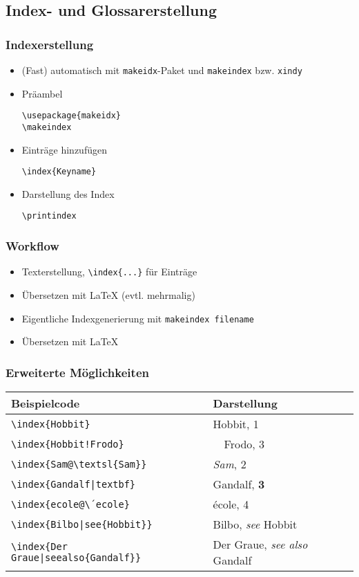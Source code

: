 \subsection{Index- und Glossarerstellung}
\begin{frame}[fragile]
  \frametitle{Indexerstellung}
  \begin{itemize}
  \item (Fast) automatisch mit \texttt{makeidx}-Paket und
    \texttt{makeindex} bzw. \texttt{xindy}
  \item Präambel
\begin{lstlisting}[language={[LaTeX]TeX}]
\usepackage{makeidx}
\makeindex
\end{lstlisting}
  \item Einträge hinzufügen
\begin{lstlisting}[language={[LaTeX]TeX}]
\index{Keyname}
\end{lstlisting}
  \item Darstellung des Index
\begin{lstlisting}[language={[LaTeX]TeX}]
\printindex
\end{lstlisting}
  \end{itemize}
\end{frame}

\begin{frame}
  \frametitle{Workflow}
  \begin{itemize}
  \item Texterstellung, \texttt{\textbackslash index\{...\}} für
    Einträge
  \item Übersetzen mit \LaTeX{} (evtl. mehrmalig)
  \item Eigentliche Indexgenerierung mit \texttt{makeindex filename}
  \item Übersetzen mit \LaTeX{}
  \end{itemize}
\end{frame}

\begin{frame}
  \frametitle{Erweiterte Möglichkeiten}
  \begin{tabular}{l|l}
    \textbf{Beispielcode} & \textbf{Darstellung}\\ \hline
    \texttt{\textbackslash index\{Hobbit\}} & Hobbit, 1\\
    \texttt{\textbackslash index\{Hobbit!Frodo\}} & $\quad$Frodo, 3\\
    \texttt{\textbackslash index\{Sam@\textbackslash textsl\{Sam\}\}}
    & \textsl{Sam}, 2\\
    \texttt{\textbackslash index\{Gandalf|textbf\}} & Gandalf, \textbf{3}\\
    \texttt{\textbackslash index\{ecole@\textbackslash ´ecole\}} &
    école, 4\\
    \texttt{\textbackslash index\{Bilbo|see\{Hobbit\}\}} & Bilbo,
    \emph{see} Hobbit\\
    \texttt{\textbackslash index\{Der Graue|seealso\{Gandalf\}\}} &
    Der Graue, \emph{see also} Gandalf
  \end{tabular}
\end{frame}

